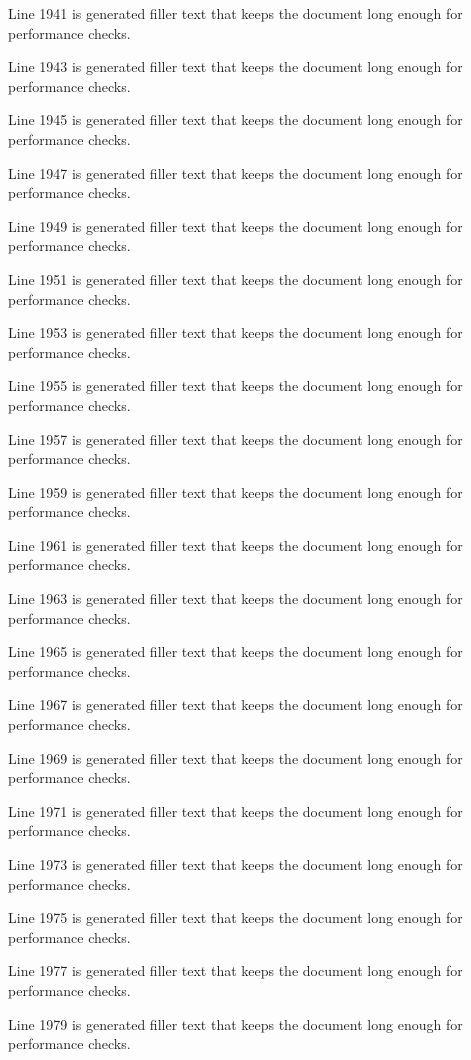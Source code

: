 Line 1941 is generated filler text that keeps the document long enough for performance checks.

Line 1943 is generated filler text that keeps the document long enough for performance checks.

Line 1945 is generated filler text that keeps the document long enough for performance checks.

Line 1947 is generated filler text that keeps the document long enough for performance checks.

Line 1949 is generated filler text that keeps the document long enough for performance checks.

Line 1951 is generated filler text that keeps the document long enough for performance checks.

Line 1953 is generated filler text that keeps the document long enough for performance checks.

Line 1955 is generated filler text that keeps the document long enough for performance checks.

Line 1957 is generated filler text that keeps the document long enough for performance checks.

Line 1959 is generated filler text that keeps the document long enough for performance checks.

Line 1961 is generated filler text that keeps the document long enough for performance checks.

Line 1963 is generated filler text that keeps the document long enough for performance checks.

Line 1965 is generated filler text that keeps the document long enough for performance checks.

Line 1967 is generated filler text that keeps the document long enough for performance checks.

Line 1969 is generated filler text that keeps the document long enough for performance checks.

Line 1971 is generated filler text that keeps the document long enough for performance checks.

Line 1973 is generated filler text that keeps the document long enough for performance checks.

Line 1975 is generated filler text that keeps the document long enough for performance checks.

Line 1977 is generated filler text that keeps the document long enough for performance checks.

Line 1979 is generated filler text that keeps the document long enough for performance checks.


